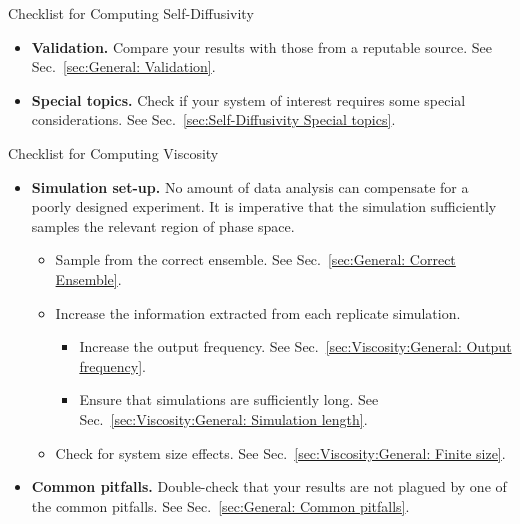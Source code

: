 \documentclass[9pt,bestpractices]{livecoms}
\begin{document}
\begin{Checklists*}[p!]
\begin{checklist}{Checklist for Computing Self-Diffusivity}
\begin{itemize}
			\item
			\textbf{Validation.} Compare your results with those from a reputable source. See Sec.\ \ref{sec:General: Validation}.
			
			\item
			\textbf{Special topics.} Check if your system of interest requires some special considerations. See Sec.\ \ref{sec:Self-Diffusivity Special topics}.
			
		\end{itemize}
	\end{checklist}
\end{Checklists*}

\begin{Checklists*}[p!]
	\begin{checklist}{Checklist for Computing Viscosity}
		\begin{itemize}
			\item
			\textbf{Simulation set-up.} No amount of data analysis can compensate for a poorly designed experiment. It is imperative that the simulation sufficiently samples the relevant region of phase space.
			\vspace{-0.325\baselineskip} %
			\begin{itemize}
				\item Sample from the correct ensemble. See Sec.\ \ref{sec:General: Correct Ensemble}.
				\item Increase the information extracted from each replicate simulation.
				\begin{itemize}
					\item Increase the output frequency. See Sec.\ \ref{sec:Viscosity:General: Output frequency}.
					\item Ensure that simulations are sufficiently long. See Sec.\ \ref{sec:Viscosity:General: Simulation length}.
				\end{itemize}
				\item Check for system size effects. See Sec.\ \ref{sec:Viscosity:General: Finite size}.
			\end{itemize}
			\vspace{-0.325\baselineskip} %
			
			\item
			\textbf{Common pitfalls.} Double-check that your results are not plagued by one of the common pitfalls. See Sec.\ \ref{sec:General: Common pitfalls}.
			

\end{itemize}
\end{checklist}
\end{Checklists*}
\end{document}
